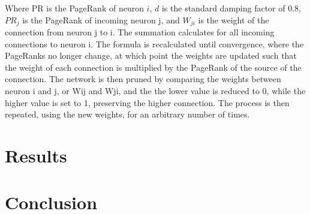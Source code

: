 \documentclass[11pt]{article}
\begin{document}
Where PR is the PageRank of neuron $i$, $d$ is the standard damping factor of 0.8, $PR_j$ is the PageRank of incoming neuron j, and $W_{ji}$ is the weight of the connection from neuron j to i. The summation calculates for all incoming connections to neuron i. The formula is recalculated until convergence, where the PageRanks no longer change, at which point the weights are updated such that the weight of each connection is multiplied by the PageRank of the source of the connection. The network is then pruned by comparing the weights between neuron i and j, or Wij and Wji, and the the lower value is reduced to 0, while the higher value is set to 1, preserving the higher connection. The process is then repeated, using the new weights, for an arbitrary number of times.\par
\section{Results}

\section{Conclusion}
\end{document}
